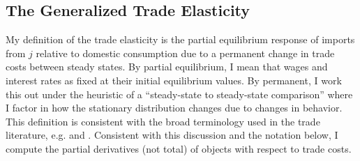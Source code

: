 \documentclass[12pt,pdftex]{article}
\newtheorem{prp}{Proposition}
\begin{document}
\begin{onehalfspacing}
%

\section{The Generalized Trade Elasticity}

My definition of the trade elasticity is the partial equilibrium response of imports from $j$ relative to domestic consumption due to a permanent change in trade costs between steady states. By partial equilibrium, I mean that wages and interest rates as fixed at their initial equilibrium values. By permanent, I work this out under the heuristic of a ``steady-state to steady-state comparison'' where I factor in how the stationary distribution changes due to changes in behavior. This definition is consistent with the broad terminology used in the trade literature, e.g. \citet{arkolakis2012new} and \citet{simonovska2014elasticity}. Consistent with this discussion and the notation below, I compute the partial derivatives (not total) of objects with respect to trade costs.


\end{onehalfspacing}
\end{document}
